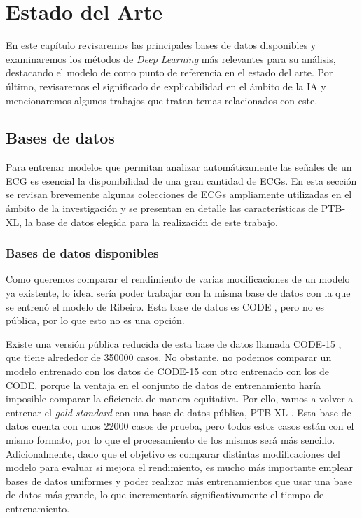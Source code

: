 \chapter{Estado del Arte}
\label{cap:estadoDeLaCuestion}

\begin{resumen}
	En este capítulo revisaremos las principales bases de datos disponibles y examinaremos los métodos de \emph{Deep Learning} más relevantes para su análisis, destacando el modelo de \cite{ribeiro} como punto de referencia en el estado del arte. Por último, revisaremos el significado de explicabilidad en el ámbito de la IA y mencionaremos algunos trabajos que tratan temas relacionados con este.
\end{resumen}

\section{Bases de datos}

Para entrenar modelos que permitan analizar automáticamente las señales de un ECG es esencial la disponibilidad de una gran cantidad de ECGs. En esta sección se revisan brevemente algunas colecciones de ECGs ampliamente utilizadas en el ámbito de la investigación y se presentan en detalle las características de PTB-XL, la base de datos elegida para la realización de este trabajo.

\subsection{Bases de datos disponibles}
\label{subsec:databases}
Como queremos comparar el rendimiento de varias modificaciones de un modelo ya existente, lo ideal sería poder trabajar con la misma base de datos con la que se entrenó el modelo de Ribeiro. Esta base de datos es CODE \citep{code}, pero no es pública, por lo que esto no es una opción.

Existe una versión pública reducida de esta base de datos llamada CODE-15 \citep{code15}, que tiene alrededor de 350000 casos. No obstante, no podemos comparar un modelo entrenado con los datos de CODE-15 con otro entrenado con los de  CODE, porque la ventaja en el conjunto de datos de entrenamiento haría imposible comparar la eficiencia de manera equitativa. Por ello, vamos a volver a entrenar el \emph{gold standard} con una base de datos pública, PTB-XL \citep{ptbxldb}. Esta base de datos cuenta con unos 22000 casos de prueba, pero todos estos casos están con el mismo formato, por lo que el procesamiento de los mismos será más sencillo. Adicionalmente, dado que el objetivo es comparar distintas modificaciones del modelo para evaluar si mejora el rendimiento, es mucho más importante emplear bases de datos uniformes y poder realizar más entrenamientos que usar una base de datos más grande, lo que incrementaría significativamente el tiempo de entrenamiento.

